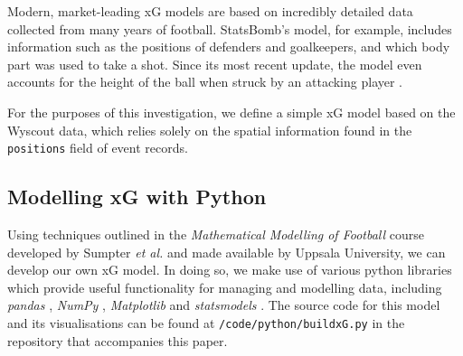 \documentclass{l4proj}
\begin{document}
Modern, market-leading xG models are based on incredibly detailed data collected from many years of football. StatsBomb's model, for example, includes information such as the positions of defenders and goalkeepers, and which body part was used to take a shot. Since its most recent update, the model even accounts for the height of the ball when struck by an attacking player \cite{sbomb3}. 

For the purposes of this investigation, we define a simple xG model based on the Wyscout data, which relies solely on the spatial information found in the \texttt{positions} field of event records.

\subsection{Modelling xG with Python}\label{xgsection}

Using techniques outlined in the \textit{Mathematical Modelling of Football} course \cite{upps1} developed by Sumpter \textit{et al.} and made available by Uppsala University, we can develop our own xG model. In doing so, we make use of various python libraries which provide useful functionality for managing and modelling data, including \textit{pandas} \cite{pand1}, \textit{NumPy} \cite{nump1}, \textit{Matplotlib} \cite{matp1} and \textit{statsmodels} \cite{stat1}. The source code for this model and its visualisations can be found at \texttt{/code/python/buildxG.py} in the repository that accompanies this paper.
\end{document}
